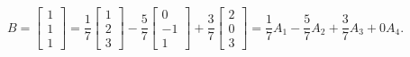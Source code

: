 \documentclass[pdf
]{beamer}
\begin{document}
{{\begin{solution}
\[ B = \left[\begin{array}{r} 1 \\ 1\\ 1 \end{array}\right]
= \frac{1}{7} \left[\begin{array}{r} 1 \\ 2 \\ 3
\end{array}\right] 
-\frac{5}{7}\left[\begin{array}{r} 0 \\ -1 \\ 1
\end{array}\right] +
\frac{3}{7}\left[\begin{array}{r} 2 \\ 0 \\ 3
\end{array}\right] 
=\frac{1}{7} A_{1} - \frac{5}{7} A_{2} + \frac{3}{7} A_{3} + 0 A_{4}.\]
\end{solution}
}}
\end{document}
